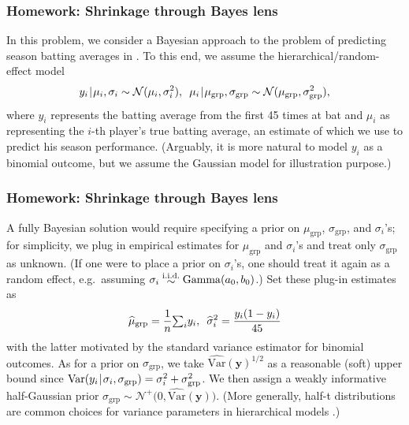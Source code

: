 \documentclass[18pt]{beamer}
\newcommand{\defineTightSpacing}{%
	\setlength{\abovedisplayskip}{.25\baselineskip}%
	\setlength{\belowdisplayskip}{.25\baselineskip}%
}
\newcommand{\given}{\thinnerspace | \thinnerspace}
\newcommand{\thinnerspace}{\mskip.5\thinmuskip}
\newcommand{\variance}{\mathrm{Var}}
\newcommand{\iidSim}{\mathrel{\raisebox{-.3ex}{$\overset{\text{i.i.d.}}{\sim}$}}}
\newcommand{\normalDist}{\mathcal{N}}
\newcommand{\gammaDist}{\mathrm{Gamma}}
\newcommand{\by}{\bm{y}}
\begin{document}
\begin{frame}
\frametitle{Homework: Shrinkage through Bayes lens}
In this problem, we consider a Bayesian approach to the problem of predicting season batting averages in \cite{efron1977stein_sci_american}.
To this end, we assume the hierarchical/random-effect model
\begin{equation*} \defineTightSpacing%
y_i \given \mu_i, \sigma_i \sim \normalDist(\mu_i, \sigma_i^2), \ \,
\mu_i \given \mu_\mathrm{grp}, \sigma_\mathrm{grp} \sim \normalDist(\mu_\mathrm{grp}, \sigma_\mathrm{grp}^2),
\end{equation*}
where $y_i$ represents the batting average from the first 45 times at bat and $\mu_i$ as representing the $i$-th player's true batting average, an estimate of which we use to predict his season performance.
(Arguably, it is more natural to model $y_i$ as a binomial outcome, but we assume the Gaussian model for illustration purpose.)
\end{frame}


\begin{frame}
\frametitle{Homework: Shrinkage through Bayes lens}
A fully Bayesian solution would require specifying a prior on $\mu_\mathrm{grp}$, $\sigma_\mathrm{grp}$, and $\sigma_i$'s; 
for simplicity, we plug in empirical estimates for $\mu_\mathrm{grp}$ and $\sigma_i$'s and treat only $\sigma_\mathrm{grp}$ as unknown.
(If one were to place a prior on $\sigma_i$'s, one should treat it again as a random effect, e.g.\ assuming $\sigma_i \iidSim \gammaDist(a_0, b_0)$.)
Set these plug-in estimates as 
\begin{equation*} \defineTightSpacing%
\widehat{\mu}_\mathrm{grp} = \frac{1}{n} {\textstyle \sum_i} y_i, \ \,
\widehat{\sigma}_i^2 = \frac{y_i (1 -  y_i)}{45}
\end{equation*}
with the latter motivated by the standard variance estimator for binomial outcomes.
As for a prior on $\sigma_{\mathrm{grp}}$, we take $\widehat{\variance}(\by)^{1/2}$ as a reasonable (soft) upper bound since $\variance(y_i \given \sigma_i, \sigma_{\textrm{grp}}) = \sigma_i^2 + \sigma_{\mathrm{grp}}^2$. 
We then assign a weakly informative half-Gaussian prior $\sigma_{\mathrm{grp}} \sim \normalDist^+\big(0, \widehat{\variance}(\by) \big)$.
(More generally, half-t distributions are common choices for variance parameters in hierarchical models \citep{gelman2006prior_for_variance}.)
\end{frame}
\end{document}
